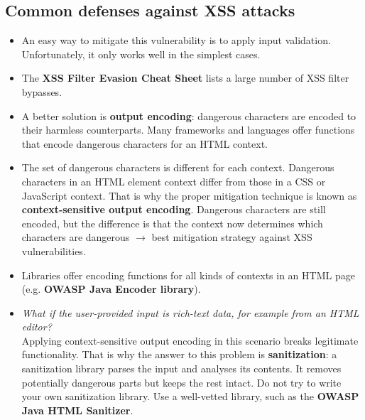 \documentclass[../main.tex]{subfiles}
\begin{document}
\subsection{Common defenses against XSS attacks}
\begin{itemize}
\item An easy way to mitigate this vulnerability is to apply input validation. Unfortunately, it only works well in the simplest cases.
\item The \textbf{XSS Filter Evasion Cheat Sheet} lists a large number of XSS filter bypasses.
\item A better solution is \textbf{output encoding}: dangerous characters are encoded to their harmless counterparts. Many frameworks and languages offer functions that encode dangerous characters for an HTML context.
\item The set of dangerous characters is different for each context. Dangerous characters in an HTML element context differ from those in a CSS or JavaScript context. That is why the proper mitigation technique is known as \textbf{context-sensitive output encoding}. Dangerous characters are still encoded, but the difference is that the context now determines which characters are dangerous $\rightarrow$ best mitigation strategy against XSS vulnerabilities.
\item Libraries offer encoding functions for all kinds of contexts in an HTML page (e.g. \textbf{OWASP Java Encoder library}).
\item \emph{What if the user-provided input is rich-text data, for example from an HTML editor?}\\
Applying context-sensitive output encoding in this scenario breaks legitimate functionality. That is why the answer to this problem is \textbf{sanitization}: a sanitization library parses the input and analyses its contents.
It removes potentially dangerous parts but keeps the rest intact. Do not try to write your own sanitization library. Use a well-vetted library, such as the \textbf{OWASP Java HTML Sanitizer}.
\end{itemize}
\end{document}
